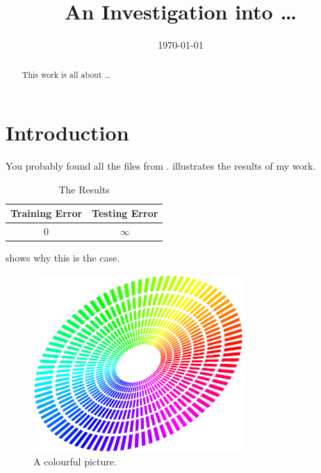 \documentclass{ecsarticle}     %
\begin{document}
\frontmatter
\title      {An Investigation into \dots}
\addresses  {\groupname\\\deptname\\\univname}
\date       {\today}
\subject    {}
\keywords   {}
\maketitle
\begin{abstract}
This work is all about \dots
\end{abstract}
\tableofcontents
\listoffigures
\listoftables
\lstlistoflistings
{}
\mainmatter
\section{Introduction} \label{Section:Introduction}
You probably found all the files from \cite{Gunn:2001:pdflatex}.
 illustrates the results of my work.
\begin{table}[!htb]
  \centering
  \begin{tabular}{cc}
  \toprule
  \textbf{Training Error} & \textbf{Testing Error}\\
  \midrule
  0 & $\infty$\\
  \bottomrule
  \end{tabular}
  \caption{The Results}
  \label{Table:tabex}
\end{table}

 shows why this is the case.
\begin{figure}[!htb]
  \centering
  \includegraphics[width=8cm]{figure}
  \caption{A colourful picture.}
  \label{Figure:figex}
\end{figure}
\end{document}
